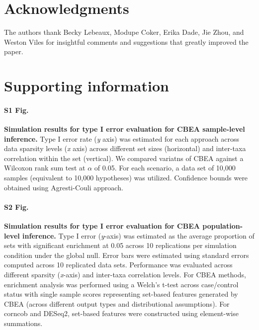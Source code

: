 \section{Acknowledgments}
The authors thank Becky Lebeaux, Modupe Coker, Erika Dade, Jie Zhou, and Weston Viles for insightful comments and suggestions that greatly improved the paper. 

\section{Supporting information}

\paragraph{S1 Fig.}
\label{S1_Fig}
{\bf Simulation results for type I error evaluation for CBEA sample-level inference.} Type I error rate (\emph{y} axis) was estimated for each approach across data sparsity levels (\emph{x} axis) across different set sizes (horizontal) and inter-taxa correlation within the set (vertical). We compared variatns of CBEA against a Wilcoxon rank sum test at $\alpha$ of 0.05. For each scenario, a data set of 10,000 samples (equivalent to 10,000 hypotheses) was utilized. Confidence bounds were obtained using Agresti-Couli approach.

\paragraph{S2 Fig.}
\label{S2_Fig}
{\bf Simulation results for type I error evaluation for CBEA population-level inference.} Type I error (\emph{y}-axis) was estimated as the average proportion of sets with significant enrichment at 0.05 across 10 replications per simulation condition under the global null. Error bars were estimated using standard errors computed across 10 replicated data sets. Performance was evaluated across different sparsity (\emph{x}-axis) and inter-taxa correlation levels. For CBEA methods, enrichment analysis was performed using a Welch's t-test across case/control status with single sample scores representing set-based features generated by CBEA (across different output types and distributional assumptions). For corncob and DESeq2, set-based features were constructed using element-wise summations.

